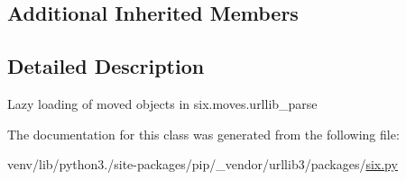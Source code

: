 \subsection*{Additional Inherited Members}


\subsection{Detailed Description}
\begin{DoxyVerb}Lazy loading of moved objects in six.moves.urllib_parse\end{DoxyVerb}
 

The documentation for this class was generated from the following file\+:\begin{DoxyCompactItemize}
\item 
venv/lib/python3./site-\/packages/pip/\+\_\+vendor/urllib3/packages/\hyperlink{pip_2__vendor_2urllib3_2packages_2six_8py}{six.\+py}\end{DoxyCompactItemize}
